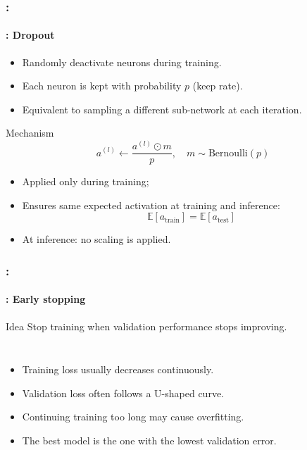 \documentclass[xcolor=table]{beamer}
\begin{document}
\begin{frame}
	\frametitle{\insertshortsubtitle: \insertsection}
	\framesubtitle{\insertsubsection: Dropout \cite{2014-srivastava}}
	
	\begin{itemize}
		\item Randomly deactivate neurons during training.
		\item Each neuron is kept with probability $p$ (keep rate).
		\item Equivalent to sampling a different sub-network at each iteration.
	\end{itemize}
	
	\begin{block}{Mechanism}
		\[
		a^{(l)} \leftarrow \frac{a^{(l)} \odot m}{p}, \quad m \sim \text{Bernoulli}(p)
		\]
	\end{block}
	
	\begin{itemize}
		\item Applied only during training;
		\item Ensures same expected activation at training and inference:
		\[
		\mathbb{E}[a_{\text{train}}] = \mathbb{E}[a_{\text{test}}]
		\]
		\item At inference: no scaling is applied.
	\end{itemize}
	
\end{frame}


\begin{frame}
	\frametitle{\insertshortsubtitle: \insertsection}
	\framesubtitle{\insertsubsection: Early stopping}

	\begin{block}{Idea}
		Stop training when validation performance stops improving.
	\end{block}
	
	\begin{columns}
		
		
		\begin{itemize}
			\item Training loss usually decreases continuously.
			\item Validation loss often follows a U-shaped curve.
			\item Continuing training too long may cause overfitting.
			\item The best model is the one with the lowest validation error.
		\end{itemize}
		
		
		\begin{center}
		\end{center}
		
		\end{columns}
\end{frame}
\end{document}
